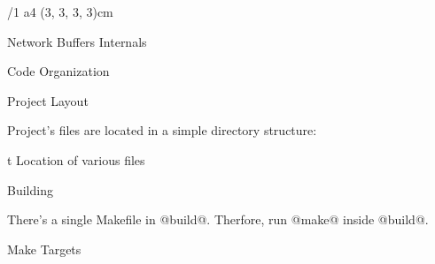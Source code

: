 

\margins/1 a4 (3, 3, 3, 3)cm
\typosize [13/15]
\activettchar@

\tit Network Buffers Internals

\chap Code Organization

\sec Project Layout

Project's files are located in a simple directory structure:

\bigskip
\centerline{
}
\bigskip
\caption/t Location of various files

\sec Building

There's a single Makefile in @build@. Therfore, run @make@ inside @build@.

\secc Make Targets

\bye
